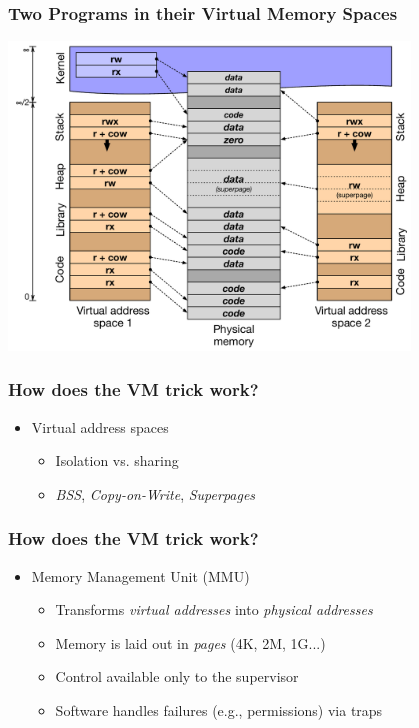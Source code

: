 \documentclass[pdftex]{beamer} %
\begin{document}
\begin{frame}
  \frametitle{Two Programs in their Virtual Memory Spaces}

  \begin{center}
    \includegraphics[width=0.8\textwidth]{../../figures/process-address-space.pdf}
  \end{center}
\end{frame}

\begin{frame}
  \frametitle{How does the VM trick work?}

  \begin{itemize}
  \item Virtual address spaces
    \begin{itemize}
    \item Isolation vs. sharing
    \item \textit{BSS}, \textit{Copy-on-Write}, \textit{Superpages}
    \end{itemize}
  \end{itemize}
\end{frame}

\begin{frame}
  \frametitle{How does the VM trick work?}

  \begin{itemize}

    \item Memory Management Unit (MMU)
    \begin{itemize}
      \item Transforms \textit{virtual addresses} into \textit{physical addresses}
      \item Memory is laid out in \textit{pages} (4K, 2M, 1G...)
      \item Control available only to the supervisor
      \item Software handles failures (e.g., permissions) via traps
    \end{itemize}
  \end{itemize}
\end{frame}
\end{document}
